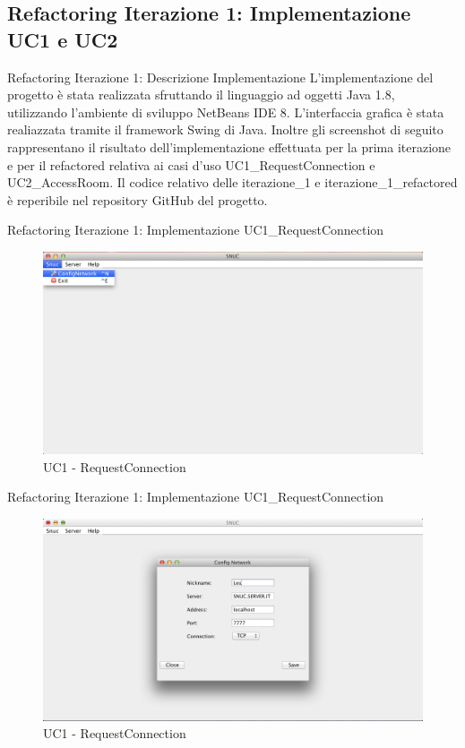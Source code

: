 \subsection{Refactoring Iterazione 1: Implementazione UC1 e UC2}
 \begin{frame} {Refactoring Iterazione 1: Descrizione Implementazione }
   L'implementazione del progetto è stata realizzata sfruttando il linguaggio ad oggetti Java 1.8, utilizzando l'ambiente di sviluppo NetBeans IDE 8. L'interfaccia 
   grafica è stata realiazzata tramite il framework Swing di Java. Inoltre gli screenshot di seguito rappresentano il risultato dell'implementazione effettuata per 
   la prima iterazione e per il refactored relativa ai casi d'uso UC1\_RequestConnection e UC2\_AccessRoom.
   \newline
   Il codice relativo delle iterazione\_1 e iterazione\_1\_refactored è reperibile nel repository GitHub del progetto.
 \end{frame}


 \begin{frame} {Refactoring Iterazione 1: Implementazione  UC1\_RequestConnection }
   \begin{figure}
    \includegraphics[scale=0.32]{image_implementation/uc1/1.png}{\centering}
    \caption{UC1 - RequestConnection}
   \end{figure}
 \end{frame}

 \begin{frame} {Refactoring Iterazione 1: Implementazione  UC1\_RequestConnection }
   \begin{figure}
    \includegraphics[scale=0.32]{image_implementation/uc1/2.png}{\centering}
    \caption{UC1 - RequestConnection}
   \end{figure}
 \end{frame}

